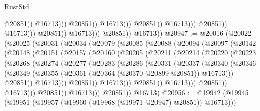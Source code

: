 \begin{lexlean}{RustStd}
\begin{coremodule}
                                                              @20851))
                                                          @16713)))
                                                    @20851))
                                                @16713)))
                                          @20851))
                                      @16713)))
                                @20851))
                            @16713)))
                      @20851))
                  @16713)))
            @20851))
        @16713))
@20947 := @20016
    (@20022
      (@20025
        (@20031
          (@20034
            (@20079
              (@20085
                (@20088
                  (@20094
                    (@20097
                      (@20142
                        (@20148
                          (@20151
                            (@20157
                              (@20160
                                (@20205
                                  (@20211
                                    (@20214
                                      (@20220
                                        (@20223
                                          (@20268
                                            (@20274
                                              (@20277
                                                (@20283
                                                  (@20286
                                                    (@20331
                                                      (@20337
                                                        (@20340
                                                          (@20346
                                                            (@20349
                                                              (@20355
                                                                (@20361
                                                                  (@20364 (@20370 @20899 @20851))
                                                                  @16713)))
                                                            @20851))
                                                        @16713)))
                                                  @20851))
                                              @16713)))
                                        @20851))
                                    @16713)))
                              @20851))
                          @16713)))
                    @20851))
                @16713)))
          @20851))
      @16713)
@20956 := @19942 (@19945 (@19951 (@19957 (@19960 (@19968 (@19971 @20947) @20851)) @16713)))

\end{coremodule}
\end{lexlean}
